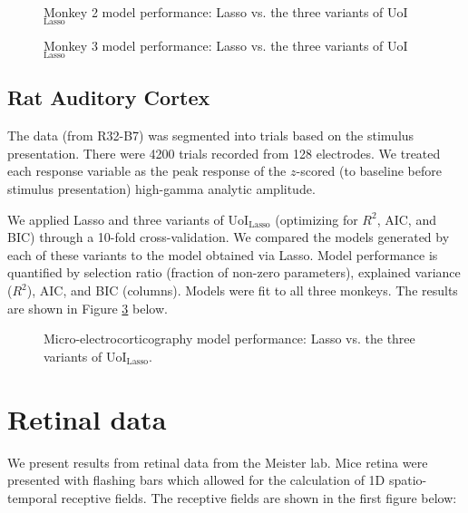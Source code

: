 \documentclass[11pt]{article}
\begin{document}
\begin{figure}[H]
	\centering
	\vspace{-10pt}
	\caption{Monkey 2 model performance: Lasso vs. the three variants of UoI$_{\text{Lasso}}$}
	\label{fig:monkey2}
\end{figure}

\begin{figure}[H]
	\centering
	\vspace{-10pt}
	\caption{Monkey 3 model performance: Lasso vs. the three variants of UoI$_{\text{Lasso}}$}
	\label{fig:monkey3}
\end{figure}

\subsection{Rat Auditory Cortex}
The data (from R32-B7) was segmented into trials based on the stimulus presentation. There were 4200 trials recorded from 128 electrodes. We treated each response variable as the peak response of the $z$-scored (to baseline before stimulus presentation) high-gamma analytic amplitude. 

We applied Lasso and three variants of UoI$_{\text{Lasso}}$ (optimizing for $R^2$, AIC, and BIC) through a 10-fold cross-validation. We compared the models generated by each of these variants to the model obtained via Lasso. Model performance is quantified by selection ratio (fraction of non-zero parameters), explained variance ($R^2$), AIC, and BIC (columns). Models were fit to all three monkeys. The results are shown in Figure \ref{fig:ecog} below.

\begin{figure}[H]
	\centering
	\vspace{-10pt}
	\caption{Micro-electrocorticography model performance: Lasso vs. the three variants of UoI$_{\text{Lasso}}$.}
	\label{fig:ecog}
\end{figure}

\newpage
\section{Retinal data}
We present results from retinal data from the Meister lab. Mice retina were presented with flashing bars which allowed for the calculation of 1D spatio-temporal receptive fields. The receptive fields are shown in the first figure below:
\end{document}
